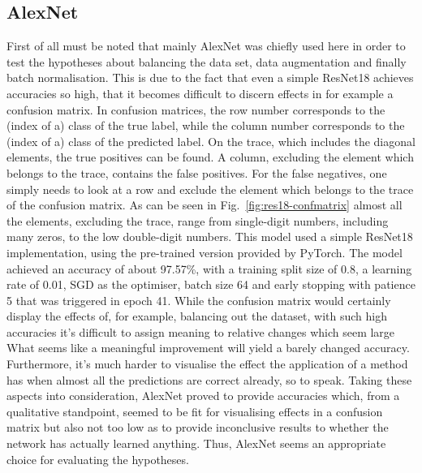 \subsection{AlexNet}\label{resultsAlexNet}
First of all must be noted that mainly AlexNet was chiefly used here in order to test the hypotheses about balancing the data set, data augmentation and finally batch normalisation. This is due to the fact that even a simple ResNet18 achieves accuracies so high, that it becomes difficult to discern effects in for example a confusion matrix. In confusion matrices, the row number corresponds to the (index of a) class of the true label, while the column number corresponds to the (index of a) class of the predicted label. On the trace, which includes the diagonal elements, the true positives can be found. A column, excluding the element which belongs to the trace, contains the false positives. For the false negatives, one simply needs to look at a row and exclude the element which belongs to the trace of the confusion matrix. As can be seen in Fig.~\ref{fig:res18-confmatrix} almost all the elements, excluding the trace, range from single-digit numbers, including many zeros, to the low double-digit numbers. This model used a simple ResNet18 implementation, using the pre-trained version provided by PyTorch. The model achieved an accuracy of about 97.57\%, with a training split size of 0.8, a learning rate of 0.01, SGD as the optimiser, batch size 64 and early stopping with patience 5 that was triggered in epoch 41. While the confusion matrix would certainly display the effects of, for example, balancing out the dataset, with such high accuracies it's difficult to assign meaning to relative changes which seem large What seems like a meaningful improvement will yield a barely changed accuracy. Furthermore, it's much harder to visualise the effect the application of a method has when almost all the predictions are correct already, so to speak. Taking these aspects into consideration, AlexNet proved to provide accuracies which, from a qualitative standpoint, seemed to be fit for visualising effects in a confusion matrix but also not too low as to provide inconclusive results to whether the network has actually learned anything. Thus, AlexNet seems an appropriate choice for evaluating the hypotheses.

